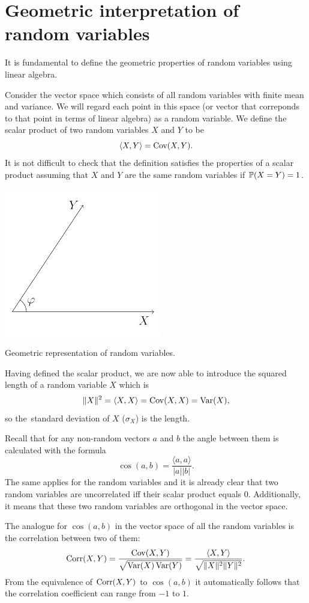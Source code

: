 \section{Geometric interpretation of random variables}\label{rvs}

It is fundamental to define the geometric properties of random
variables using linear algebra.

Consider the vector space which consists of all random variables with finite
mean and variance.
We will regard each point in this space (or vector that correponds to that point
in terms of linear algebra) as a random variable.
We define the scalar product of two random variables $X$ and $Y$ to be
\[
\langle X, Y \rangle = \Cov(X,Y).
\]
It is not difficult to check that the definition satisfies the properties
of a scalar product assuming that $X$ and $Y$ are the same random variables
if $\P(X=Y)=1$.

\begin{marginfigure}
\includegraphics{figures/01_corr_def.pdf}
\caption{Geometric representation of random variables.}
\label{fig:corr_def}
\end{marginfigure}

Having defined the scalar product, we are now able to introduce the squared
length of a random variable $X$ which is
\[
\lVert X \rVert^2 = \langle X, X \rangle = \Cov(X,X) = \Var(X),
\]
so the~standard
deviation of $X$ ($\sigma_X$) is the length.

Recall that for any non-random vectors $a$ and $b$ the angle
between them is calculated with the formula
\[
\cos(a, b) = \frac{\langle a,  a\rangle}{|a| |b|}.
\]
The same applies for the random variables and it is already clear that
two random variables are uncorrelated iff their scalar product
equals $0$. Additionally, it means that these two random variables
are orthogonal in the vector space.

The analogue for $\cos(a, b)$ in the vector space of all the random
variables is the correlation between two of them:
\[
\Corr(X,Y) = \frac{\Cov(X,Y)}{\sqrt{\Var(X)\Var(Y)}} = \frac{\langle X, Y \rangle}{\sqrt{\lVert X \rVert^2 \lVert Y \rVert^2}}.
\]
From the equivalence of $\Corr(X,Y)$ to $\cos(a, b)$ it
automatically follows that the correlation coefficient can range from $-1$ to $1$.

